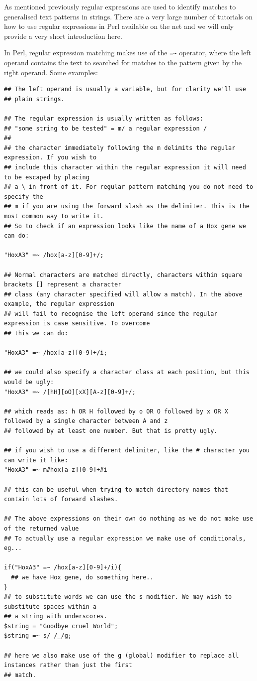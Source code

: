 \documentclass[11pt]{article}
\begin{document}
As mentioned previously regular expressions are used to identify matches
to generalised text patterns in strings. There are a very large number
of tutorials on how to use regular expressions in Perl available on the
net and we will only provide a very short introduction here.

In Perl, regular expression matching makes use of the \texttt{=\textasciitilde{}} operator,
where the left operand contains the text to searched for matches to the
pattern given by the right operand. Some examples:

\begin{verbatim}
## The left operand is usually a variable, but for clarity we'll use
## plain strings.

## The regular expression is usually written as follows:
## "some string to be tested" = m/ a regular expression /
##
## the character immediately following the m delimits the regular expression. If you wish to
## include this character within the regular expression it will need to be escaped by placing
## a \ in front of it. For regular pattern matching you do not need to specify the
## m if you are using the forward slash as the delimiter. This is the most common way to write it.
## So to check if an expression looks like the name of a Hox gene we can do:

"HoxA3" =~ /hox[a-z][0-9]+/;

## Normal characters are matched directly, characters within square brackets [] represent a character
## class (any character specified will allow a match). In the above example, the regular expression
## will fail to recognise the left operand since the regular expression is case sensitive. To overcome
## this we can do:

"HoxA3" =~ /hox[a-z][0-9]+/i;

## we could also specify a character class at each position, but this would be ugly:
"HoxA3" =~ /[hH][oO][xX][A-z][0-9]+/;

## which reads as: h OR H followed by o OR O followed by x OR X followed by a single character between A and z
## followed by at least one number. But that is pretty ugly.

## if you wish to use a different delimiter, like the # character you can write it like:
"HoxA3" =~ m#hox[a-z][0-9]+#i

## this can be useful when trying to match directory names that contain lots of forward slashes.

## The above expressions on their own do nothing as we do not make use of the returned value
## To actually use a regular expression we make use of conditionals, eg...

if("HoxA3" =~ /hox[a-z][0-9]+/i){
  ## we have Hox gene, do something here..
}
## to substitute words we can use the s modifier. We may wish to substitute spaces within a
## a string with underscores.
$string = "Goodbye cruel World";
$string =~ s/ /_/g;

## here we also make use of the g (global) modifier to replace all instances rather than just the first
## match.
\end{verbatim}
\end{document}
